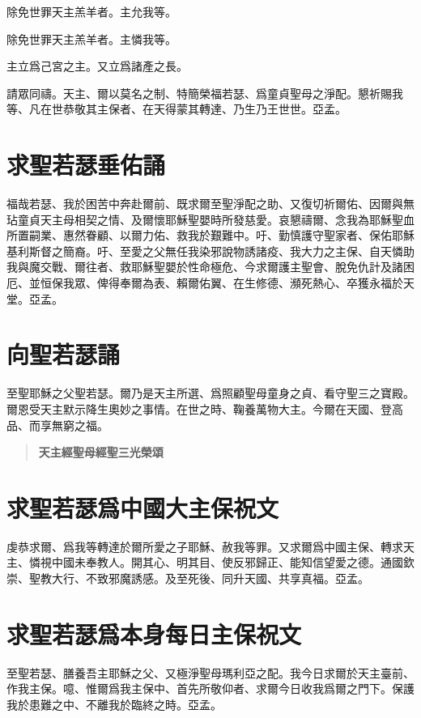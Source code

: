 \versicle 除免世罪天主羔羊者。\hfill \response 主允我等。

\versicle 除免世罪天主羔羊者。\hfill \response 主憐我等。

\versicle 主立爲己宮之主。\hfill \response 又立爲諸產之長。

\versicle 請眾同禱。{\cspace}天主、爾以莫名之制、特簡榮福若瑟、爲童貞聖母之淨配。懇祈賜我等、凡在世恭敬其主保者、在天得蒙其轉達、乃生乃王世世。{\cspace}亞孟。

\section*{求聖若瑟垂佑誦}
福哉若瑟、我於困苦中奔赴爾前、既求爾至聖淨配之助、又復切祈爾佑、因爾與無玷童貞天主母相契之情、及爾懷耶穌聖嬰時所發慈愛。哀懇禱爾、念我為耶穌聖血所置嗣業、惠然眷顧、以爾力佑、救我於艱難中。吁、勤慎護守聖家者、保佑耶穌基利斯督之簡裔。吁、至愛之父無任我染邪說物誘諸疫、我大力之主保、自天憐助我與魔交戰、爾往者、救耶穌聖嬰於性命極危、今求爾護主聖會、脫免仇計及諸困厄、並恒保我眾、俾得奉爾為表、賴爾佑翼、在生修德、瀕死熱心、卒獲永福於天堂。{\cspace}亞孟。

\section*{向聖若瑟誦}
至聖耶穌之父聖若瑟。爾乃是天主所選、爲照顧聖母童身之貞、看守聖三之寶殿。爾恩受天主默示降生奧妙之事情。在世之時、鞠養萬物大主。今爾在天國、登高品、而享無窮之福。

\begin{quote}\bfseries 天主經\quad 聖母經\quad 聖三光榮頌\end{quote}

\section*{求聖若瑟爲中國大主保祝文}
虔恭求爾、爲我等轉達於爾所愛之子耶穌、赦我等罪。又求爾爲中國主保、轉求天主、憐視中國未奉教人。開其心、明其目、使反邪歸正、能知信望愛之德。通國欽崇、聖教大行、不致邪魔誘感。及至死後、同升天國、共享真福。{\cspace}亞孟。

\section*{求聖若瑟爲本身每日主保祝文}
至聖若瑟、膳養吾主耶穌之父、又極淨聖母瑪利亞之配。我今日求爾於天主臺前、作我主保。噫、惟爾爲我主保中、首先所敬仰者、求爾今日收我爲爾之門下。保護我於患難之中、不離我於臨終之時。{\cspace}亞孟。
